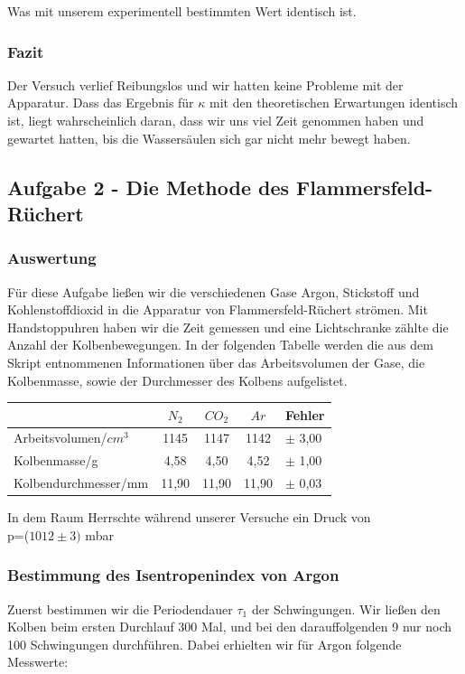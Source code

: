 \documentclass{article}
\begin{document}
{{{Was mit unserem experimentell bestimmten Wert identisch ist.

\subsubsection{Fazit}
Der Versuch verlief Reibungslos und wir hatten keine Probleme mit der Apparatur. Dass das Ergebnis für \(\kappa\) mit den theoretischen Erwartungen identisch ist, liegt wahrscheinlich daran, dass wir uns viel Zeit genommen haben und gewartet hatten, bis die Wassersäulen sich gar nicht mehr bewegt haben.

\vspace{1 cm}
\subsection{Aufgabe 2 - Die Methode des Flammersfeld-Rüchert}
\subsubsection{Auswertung}
Für diese Aufgabe ließen wir die verschiedenen Gase Argon, Stickstoff und Kohlenstoffdioxid in die Apparatur von Flammersfeld-Rüchert strömen. Mit Handstoppuhren haben wir die Zeit gemessen und eine Lichtschranke zählte die Anzahl der Kolbenbewegungen. In der folgenden Tabelle werden die aus dem Skript entnommenen Informationen über das Arbeitsvolumen der Gase, die Kolbenmasse, sowie der Durchmesser des Kolbens aufgelistet.

\begin{center}
\begin{tabular}{l|c|c|c|l}
& {$N_2$} & {$CO_2$}& {$Ar$}& {Fehler}\\
\hline 
Arbeitsvolumen/\(cm^3\)  & 1145 & 1147 & 1142 & \(\pm\) 3,00 \\ 
Kolbenmasse/g  & 4,58 & 4,50 & 4,52 & \(\pm\) 1,00\\ 
Kolbendurchmesser/mm & 11,90 & 11,90 & 11,90 & \(\pm\) 0,03\\
\end{tabular}
\end{center}

\newpage
In dem Raum Herrschte während unserer Versuche ein Druck von\\ p=(\(1012\pm 3)\) mbar

\subsubsection{Bestimmung des Isentropenindex von Argon}
Zuerst bestimmen wir die Periodendauer \(\tau_{1}\) der Schwingungen. Wir ließen den Kolben beim ersten Durchlauf 300 Mal, und bei den darauffolgenden 9 nur noch 100 Schwingungen 
durchführen. Dabei erhielten wir für Argon folgende Messwerte:

}}}
\end{document}
